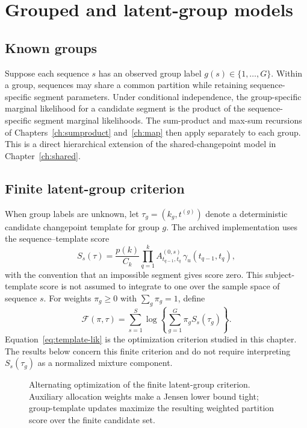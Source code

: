 \chapter{Grouped and latent-group models}
\label{ch:templates}

\section{Known groups}
Suppose each sequence $s$ has an observed group label $g(s)\in\{1,\ldots,G\}$. Within a group,
sequences may share a common partition while retaining sequence-specific segment parameters. Under
conditional independence, the group-specific marginal likelihood for a candidate segment is the
product of the sequence-specific segment marginal likelihoods. The sum-product and max-sum
recursions of Chapters~\ref{ch:sumproduct} and~\ref{ch:map} then apply separately to each group.
This is a direct hierarchical extension of the shared-changepoint model in Chapter~\ref{ch:shared}.

\section{Finite latent-group criterion}
When group labels are unknown, let $\tau_g=(k_g,t^{(g)})$ denote a deterministic candidate
changepoint template for group $g$. The archived implementation uses the sequence--template score
\begin{equation}
 S_s(\tau)=\frac{p(k)}{C_k}\prod_{q=1}^{k}
 A^{(0,s)}_{t_{q-1},t_q}\,\gamma_u(t_{q-1},t_q),
\label{eq:template-sequence-score}
\end{equation}
with the convention that an impossible segment gives score zero. This subject-template score is not assumed
to integrate to one over the sample space of sequence $s$. For weights $\pi_g\ge0$ with
$\sum_g\pi_g=1$, define
\begin{equation}
 \mathcal F(\pi,\tau)=\sum_{s=1}^{S}\log\left\{\sum_{g=1}^{G}\pi_g S_s(\tau_g)\right\}.
\label{eq:template-lik}
\end{equation}
Equation~\eqref{eq:template-lik} is the optimization criterion studied in this chapter. The results
below concern this finite criterion and do not require interpreting $S_s(\tau_g)$ as a normalized
mixture component.

\begin{figure}[H]
\centering
\resizebox{0.96\textwidth}{!}{}
\caption{Alternating optimization of the finite latent-group criterion. Auxiliary allocation
weights make a Jensen lower bound tight; group-template updates maximize the resulting weighted
partition score over the finite candidate set.}
\label{fig:latent-group}
\end{figure}

